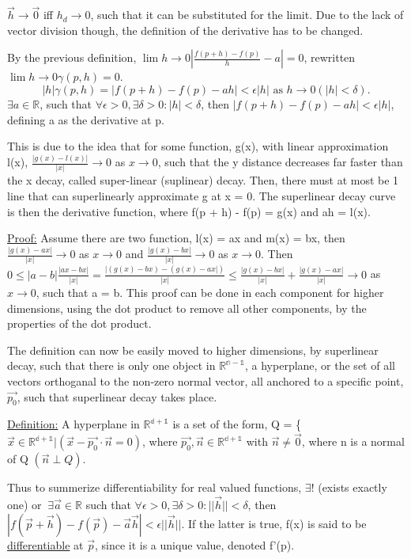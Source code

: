 \documentclass[11 pt, twoside]{article}
\begin{document}
$\vec{h} \to \vec{0}$ iff $h_d \to 0$, such that it can be substituted for the limit. Due to the lack of vector division though, the definition of the derivative has to be changed.

By the previous definition, $\lim{h \to 0} |\frac{f(p+h) - f(p)}{h} - a| = 0$, rewritten  $\lim{h \to 0} \gamma(p, h) = 0$. $$ |h|\gamma(p, h) = |f(p+h) - f(p) - ah| < \epsilon|h| \text{ as } h \to 0 (|h| < \delta).$$ $\exists a \in \mathbb{R}$, such that $\forall \epsilon > 0, \exists \delta > 0: |h| < \delta$, then $|f(p + h) - f(p) - ah| < \epsilon|h|$, defining a as the derivative at p.

This is due to the idea that for some function, g(x), with linear approximation l(x), $\frac{|g(x) - l(x)|}{|x|} \to 0$ as $x \to 0$, such that the y distance decreases far faster than the x decay, called super-linear (suplinear) decay. Then, there must at most be 1 line that can superlinearly approximate g at x = 0. The superlinear decay curve is then the derivative function, where f(p + h) - f(p) = g(x) and ah = l(x).

\underline{Proof:}
Assume there are two function, l(x) = ax and m(x) = bx, then $\frac{|g(x) - ax|}{|x|} \to 0$ as $x \to 0$ and $\frac{|g(x) - bx|}{|x|} \to 0$ as $x \to 0$. Then $0 \leq |a - b| \frac{|ax - bx|}{|x|} = \frac{|(g(x) - bx) - (g(x) - ax|)}{|x|} \leq \frac{|g(x) - bx|}{|x|} + \frac{|g(x) - ax|}{|x|} \to 0$ as $x \to 0$, such that a = b. This proof can be done in each component for higher dimensions, using the dot product to remove all other components, by the properties of the dot product.

The definition can now be easily moved to higher dimensions, by superlinear decay, such that there is only one object in $\mathbb{R^{n-1}}$, a hyperplane, or the set of all vectors orthoganal to the non-zero normal vector, all anchored to a specific point, $\vec{p_0}$, such that superlinear decay takes place.

\underline{Definition:}
A hyperplane in $\mathbb{R^{d+1}}$ is a set of the form, Q = \{$\vec{x} \in \mathbb{R^{d+1}} | (\vec{x} - \vec{p_0} \cdot \vec{n} = 0)$, where $\vec{p_0}, \vec{n} \in \mathbb{R^{d+1}}$ with $\vec{n} \neq \vec{0}$, where n is a normal of Q $(\vec{n} \perp Q)$.

Thus to summerize differentiability for real valued functions, $\exists !$ (exists exactly one) or $~\exists \vec{a} \in \mathbb{R}$ such that $\forall \epsilon > 0, \exists \delta > 0: ||\vec{h}|| < \delta$, then $|f(\vec{p} + \vec{h}) - f(\vec{p}) - \vec{a}\vec{h}| < \epsilon||\vec{h}||$. If the latter is true, f(x) is said to be \underline{differentiable} at $\vec{p}$, since it is a unique value, denoted f'(p). 
\end{document}
